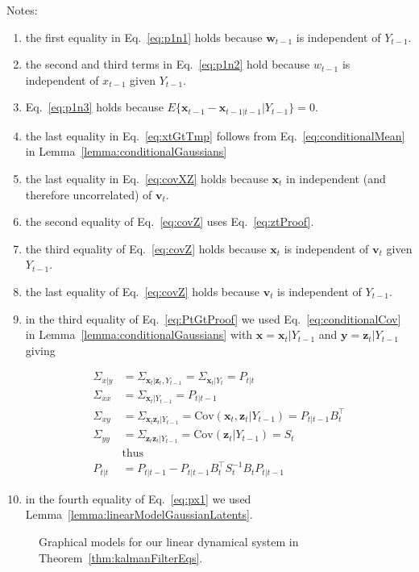 \documentclass[12pt]{article}
\begin{document}
Notes:
\begin{enumerate}
    \item the first equality in Eq.~\ref{eq:p1n1} holds because
        $\mathbf{w}_{t-1}$ is independent of $Y_{t-1}$.
    \item the second and third terms in Eq.~\ref{eq:p1n2} hold because
        $w_{t-1}$ is independent of $x_{t-1}$ given $Y_{t-1}$.
    \item Eq.~\ref{eq:p1n3} holds because
        $E\{\mathbf{x}_{t-1}-\mathbf{x}_{t-1|t-1}|Y_{t-1}\}=0$.
    \item the last equality in Eq.~\ref{eq:xtGtTmp} follows from Eq.~\ref{eq:conditionalMean} in
        Lemma~\ref{lemma:conditionalGaussians}
    \item the last equality in Eq.~\ref{eq:covXZ} holds because $\mathbf{x}_t$
        in independent (and therefore uncorrelated) of $\mathbf{v}_t$.
    \item the second equality of Eq.~\ref{eq:covZ} uses Eq.~\ref{eq:ztProof}.
    \item the third equality of Eq.~\ref{eq:covZ} holds because $\mathbf{x}_t$
        is independent of $\mathbf{v}_t$ given $Y_{t-1}$.
    \item the last equality of Eq.~\ref{eq:covZ} holds because $\mathbf{v}_t$
        is independent of $Y_{t-1}$.
	\item in the third equality of Eq.~\ref{eq:PtGtProof} we used Eq.~\ref{eq:conditionalCov} in Lemma~\ref{lemma:conditionalGaussians}
	with $\mathbf{x}=\mathbf{x}_t|Y_{t-1}$ and $\mathbf{y}=\mathbf{z}_t|Y_{t-1}$ giving

		\begin{align*}
			\Sigma_{x|y}&=\Sigma_{\mathbf{x}_t|\mathbf{z}_t,Y_{t-1}}=\Sigma_{\mathbf{x}_t|Y_t}=P_{t|t}\\
			\Sigma_{xx}&=\Sigma_{\mathbf{x}_t|Y_{t-1}}=P_{t|t-1}\\
			\Sigma_{xy}&=\Sigma_{\mathbf{x}_t\mathbf{z}_t|Y_{t-1}}=\text{Cov}(\mathbf{x}_t,\mathbf{z}_t|Y_{t-1})=P_{t|t-1}B_t^\intercal\\
			\Sigma_{yy}&=\Sigma_{\mathbf{z}_t\mathbf{z}_t|Y_{t-1}}=\text{Cov}(\mathbf{z}_t|Y_{t-1})=S_t\\
                        &\text{thus}\\
            P_{t|t}&=P_{t|t-1}-P_{t|t-1}B_t^\intercal S_t^{-1}B_tP_{t|t-1}
		\end{align*}
	\item in the fourth equality of Eq.~\ref{eq:px1} we used Lemma~\ref{lemma:linearModelGaussianLatents}.

\end{enumerate}

\begin{figure}
    \centering
    
    \caption{Graphical models for our linear dynamical system in
    Theorem~\ref{thm:kalmanFilterEqs}.}
    \label{fig:ldsModel}
\end{figure}



\pagebreak





\end{document}
